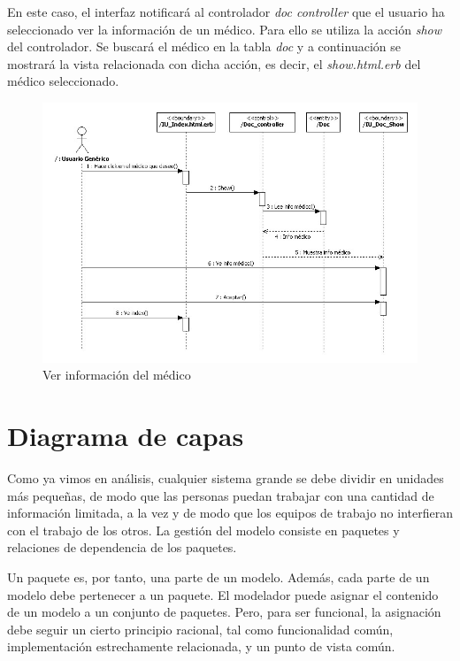 \documentclass[a4paper,oneside,11pt]{book}
\begin{document}
		En este caso, el interfaz notificará al controlador \textit{doc controller} que el usuario ha seleccionado ver la información de un médico. Para ello se utiliza la acción \textit{show} del controlador. Se buscará el médico en la tabla \textit{doc} y a continuación se mostrará la vista relacionada con dicha acción, es decir, el \textit{show.html.erb} del médico seleccionado.
		\begin{figure}[H]
		  \centering
		    \includegraphics[width=16cm]{img/jpg/secuencia/02_VerInfoMedico.jpg}
		  \caption{Ver información del médico}
		  \label{fig:sec_general_verinfomedico}
		\end{figure}
		
	
		
	\newpage
	\section{Diagrama de capas} %
	\label{sec:diagrama_de_capas}
	
		Como ya vimos en análisis, cualquier sistema grande se debe dividir en unidades más pequeñas, de modo que las personas puedan trabajar con una cantidad de información limitada, a la vez y de modo que los equipos de trabajo no interfieran con el trabajo de los otros. La gestión del modelo consiste en paquetes y relaciones de dependencia de los paquetes.
		
		Un paquete es, por tanto, una parte de un modelo. Además, cada parte de un modelo debe pertenecer a un paquete. El modelador puede asignar el contenido de un modelo a un conjunto de paquetes. Pero, para ser funcional, la asignación debe seguir un cierto principio racional, tal como funcionalidad común, implementación estrechamente relacionada, y un punto de vista común.
		
\end{document}
